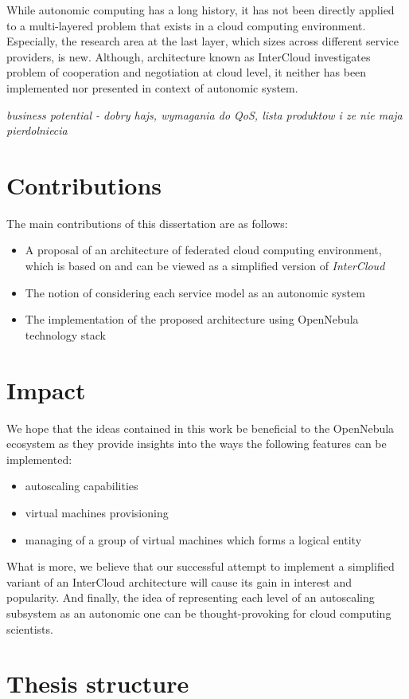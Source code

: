 While autonomic computing has a long history, it has not been directly applied to a multi-layered problem that exists in a cloud computing environment. Especially, the research area at the last layer, which sizes across different service providers, is new. Although, architecture known as InterCloud investigates problem of cooperation and negotiation at cloud level, it neither has been implemented nor presented in context of autonomic system.

\textit{business potential - dobry hajs, wymagania do QoS, lista produktow i ze nie maja pierdolniecia}

\section{Contributions}
The main contributions of this dissertation are as follows:
\begin{itemize}
  \item A proposal of an architecture of federated cloud computing environment, which is based on and can be viewed as a simplified version of \emph{InterCloud}
  \item The notion of considering each service model as an autonomic system
  \item The implementation of the proposed architecture using OpenNebula technology stack
\end{itemize}

\section{Impact}
We hope that the ideas contained in this work be beneficial to the OpenNebula ecosystem as they provide insights into the ways the following features can be implemented:
\begin{itemize}
  \item autoscaling capabilities
  \item virtual machines provisioning
  \item managing of a group of virtual machines which forms a logical entity
\end{itemize}
What is more, we believe that our successful attempt to implement a simplified variant of an InterCloud architecture will cause its gain in interest and popularity. And finally, the idea of representing each level of an autoscaling subsystem as an autonomic one can be thought-provoking for cloud computing scientists.
\section{Thesis structure}
